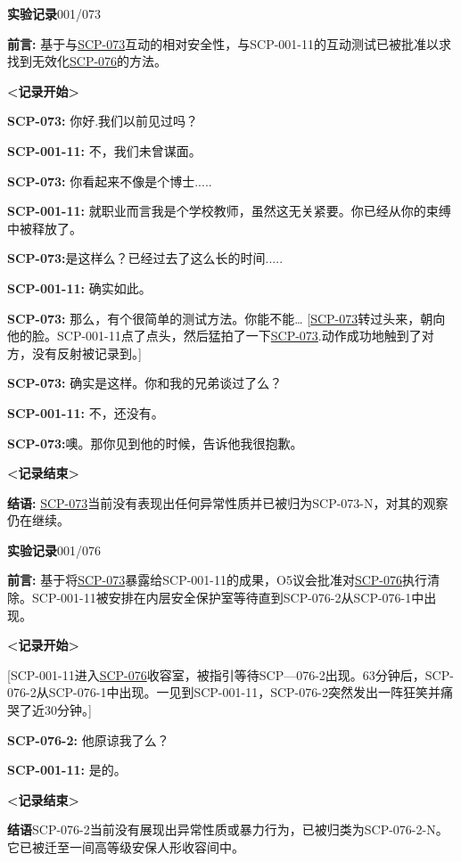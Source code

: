 \documentclass[openany,a4paper]{book} %
\begin{document}
\begin{colorboxed}
\textbf{实验记录}001/073

\textbf{前言: }基于与\hyperref[chap:SCP-073]{SCP-073}互动的相对安全性，与SCP-001-11的互动测试已被批准以求找到无效化\hyperref[chap:SCP-076]{SCP-076}的方法。

\textbf{<记录开始>}

\textbf{SCP-073: }你好.我们以前见过吗？

\textbf{SCP-001-11:} 不，我们未曾谋面。

\textbf{SCP-073:} 你看起来不像是个博士.....

\textbf{SCP-001-11:} 就职业而言我是个学校教师，虽然这无关紧要。你已经从你的束缚中被释放了。

\textbf{SCP-073:}是这样么？已经过去了这么长的时间.....

\textbf{SCP-001-11:} 确实如此。

\textbf{SCP-073:} 那么，有个很简单的测试方法。你能不能… [\hyperref[chap:SCP-073]{SCP-073}转过头来，朝向他的脸。SCP-001-11点了点头，然后猛拍了一下\hyperref[chap:SCP-073]{SCP-073}.动作成功地触到了对方，没有反射被记录到。]

\textbf{SCP-073:} 确实是这样。你和我的兄弟谈过了么？

\textbf{SCP-001-11:} 不，还没有。

\textbf{SCP-073:}噢。那你见到他的时候，告诉他我很抱歉。

\textbf{<记录结束>}

\textbf{结语:} \hyperref[chap:SCP-073]{SCP-073}当前没有表现出任何异常性质并已被归为SCP-073-N，对其的观察仍在继续。\vspace{12pt}

\textbf{实验记录}001/076

\textbf{前言:} 基于将\hyperref[chap:SCP-073]{SCP-073}暴露给SCP-001-11的成果，O5议会批准对\hyperref[chap:SCP-076]{SCP-076}执行清除。SCP-001-11被安排在内层安全保护室等待直到SCP-076-2从SCP-076-1中出现。

\textbf{<记录开始>}

[SCP-001-11进入\hyperref[chap:SCP-076]{SCP-076}收容室，被指引等待SCP—076-2出现。63分钟后，SCP-076-2从SCP-076-1中出现。一见到SCP-001-11，SCP-076-2突然发出一阵狂笑并痛哭了近30分钟。]

\textbf{SCP-076-2: }他原谅我了么？

\textbf{SCP-001-11:} 是的。

\textbf{<记录结束>}

\textbf{结语}SCP-076-2当前没有展现出异常性质或暴力行为，已被归类为SCP-076-2-N。它已被迁至一间高等级安保人形收容间中。

\end{colorboxed}
\end{document}
